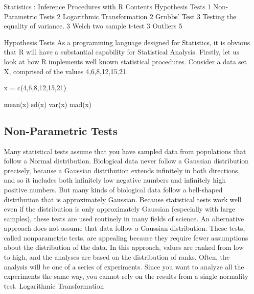 Statistics : Inference Procedures with R
Contents
Hypothesis Tests	1
Non-Parametric Tests	2
Logarithmic  Transformation	2
Grubbs’ Test	3
Testing the equality of variance.	3
Welch two sample t-test	3
Outliers	5

Hypothesis Tests
As a programming language designed for Statistics, it is obvious that R will have a substantial capability for Statistical Analysis.
Firstly, let us look at how R implements well known statistical procedures.  Consider a data set X, comprised of the values {4,6,8,12,15,21}.

x = c(4,6,8,12,15,21)

mean(x)
sd(x)
var(x)
mad(x)


\subsection{Non-Parametric Tests}
Many statistical tests assume that you have sampled data from populations that follow a Normal distribution. 
Biological data never follow a Gaussian distribution precisely, because a Gaussian distribution extends infinitely in both directions, and so it includes both infinitely low negative numbers and infinitely high positive numbers. But many kinds of biological data follow a bell-shaped distribution that is approximately Gaussian. 
Because statistical tests work well even if the distribution is only approximately Gaussian (especially with large samples), these tests are used routinely in many fields of science.
An alternative approach does not assume that data follow a Gaussian distribution. These tests, called nonparametric tests, are appealing because they require fewer assumptions about the distribution of the data. In this approach, values are ranked from low to high, and the analyses are based on the distribution of ranks.
Often, the analysis will be one of a series of experiments. Since you want to analyze all the experiments the same way, you cannot rely on the results from a single normality test.
Logarithmic  Transformation

